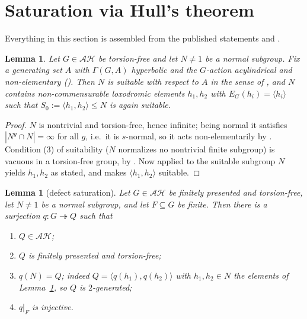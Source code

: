 \documentclass[11pt]{amsart}
\newtheorem{lemma}[theorem]{Lemma}
\theoremstyle{remark}
\theoremstyle{definition}
\begin{document}
\section{Saturation via Hull's theorem}\label{sec:saturation}

Everything in this section is assembled from the published statements
\cite[Definition~1.4, Lemma~3.5, Lemma~5.5, Corollary~5.7, Lemma~5.8,
Theorem~3.12, Theorem~7.1]{Hull16} and \cite[Lemma~7.1]{Osin16}.

\begin{lemma}\label{lem:suitable}
Let $G\in\mathcal{AH}$ be torsion-free and let $N\neq1$ be a normal subgroup.
Fix a generating set $A$ with $\Gamma(G,A)$ hyperbolic and the $G$-action
acylindrical and non-elementary (\cite[Theorem~3.12(4)]{Hull16}).  Then $N$
is suitable with respect to $A$ in the sense of
\cite[Definition~1.4]{Hull16}, and $N$ contains non-commensurable loxodromic
elements $h_1,h_2$ with $E_G(h_i)=\langle h_i\rangle$ such that
$S_0:=\langle h_1,h_2\rangle\leq N$ is again suitable.
\end{lemma}

\begin{proof}
$N$ is nontrivial and torsion-free, hence infinite; being normal it
satisfies $|N^g\cap N|=\infty$ for all $g$, i.e.\ it is $s$-normal, so it
acts non-elementarily by \cite[Lemma~7.1]{Osin16}.  Condition (3) of
suitability ($N$ normalizes no nontrivial finite subgroup) is vacuous in a
torsion-free group, by \cite[Lemma~5.5]{Hull16}.  Now
\cite[Corollary~5.7]{Hull16} applied to the suitable subgroup $N$ yields
$h_1,h_2$ as stated, and \cite[Lemma~5.8]{Hull16} makes
$\langle h_1,h_2\rangle$ suitable.
\end{proof}

\begin{lemma}[defect saturation]\label{lem:saturation}
Let $G\in\mathcal{AH}$ be finitely presented and torsion-free, let
$N\neq1$ be a normal subgroup, and let $F\subseteq G$ be finite.  Then there
is a surjection $q\colon G\twoheadrightarrow Q$ such that
\begin{enumerate}
\item $Q\in\mathcal{AH}$;
\item $Q$ is finitely presented and torsion-free;
\item $q(N)=Q$; indeed $Q=\langle q(h_1),q(h_2)\rangle$ with
  $h_1,h_2\in N$ the elements of Lemma~\textup{\ref{lem:suitable}}, so $Q$
  is $2$-generated;
\item $q|_F$ is injective.
\end{enumerate}
\end{lemma}
\end{document}
